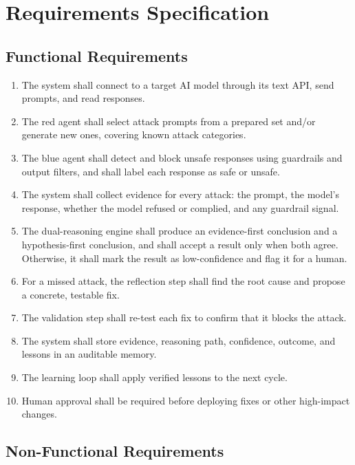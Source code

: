 \chapter{Requirements Specification}
\label{ch:req}

\section{Functional Requirements}

\begin{enumerate}[label=\textbf{FR\arabic*.}, widest=10, leftmargin=*]
  \item The system shall connect to a target AI model through its text API, send
  prompts, and read responses.
  \item The red agent shall select attack prompts from a prepared set and/or
  generate new ones, covering known attack categories.
  \item The blue agent shall detect and block unsafe responses using guardrails
  and output filters, and shall label each response as safe or unsafe.
  \item The system shall collect evidence for every attack: the prompt, the
  model's response, whether the model refused or complied, and any guardrail
  signal.
  \item The dual-reasoning engine shall produce an evidence-first conclusion and a
  hypothesis-first conclusion, and shall accept a result only when both agree.
  Otherwise, it shall mark the result as low-confidence and flag it for a human.
  \item For a missed attack, the reflection step shall find the root cause and
  propose a concrete, testable fix.
  \item The validation step shall re-test each fix to confirm that it blocks the
  attack.
  \item The system shall store evidence, reasoning path, confidence, outcome, and
  lessons in an auditable memory.
  \item The learning loop shall apply verified lessons to the next cycle.
  \item Human approval shall be required before deploying fixes or other
  high-impact changes.
\end{enumerate}

\section{Non-Functional Requirements}

